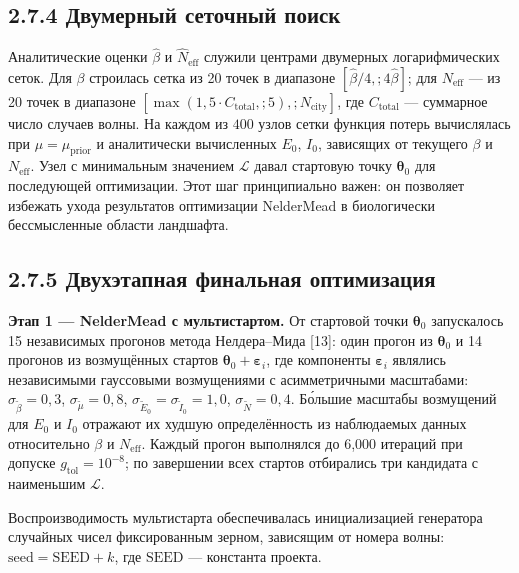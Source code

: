 \documentclass[12pt]{article}
\begin{document}
\subsection{2.7.4 Двумерный сеточный
поиск}\label{ux434ux432ux443ux43cux435ux440ux43dux44bux439-ux441ux435ux442ux43eux447ux43dux44bux439-ux43fux43eux438ux441ux43a}

Аналитические оценки \(\hat{\beta}\) и \(\hat{N}_{\text{eff}}\) служили
центрами двумерных логарифмических сеток. Для \(\beta\) строилась сетка
из 20 точек в диапазоне \([\hat{\beta}/4,; 4\hat{\beta}]\); для
\(N_{\text{eff}}\) --- из 20 точек в диапазоне
\([\max(1{,}5 \cdot C_{\text{total}},; 5),; N_{\text{city}}]\), где
\(C_{\text{total}}\) --- суммарное число случаев волны. На каждом из
\(400\) узлов сетки функция потерь вычислялась при
\(\mu = \mu_{\text{prior}}\) и аналитически вычисленных \(E_0\),
\(I_0\), зависящих от текущего \(\beta\) и \(N_{\text{eff}}\). Узел с
минимальным значением \(\mathcal{L}\) давал стартовую точку
\(\boldsymbol{\theta}_0\) для последующей оптимизации. Этот шаг
принципиально важен: он позволяет избежать ухода результатов оптимизации
NelderMead в биологически бессмысленные области ландшафта.

\subsection{2.7.5 Двухэтапная финальная
оптимизация}\label{ux434ux432ux443ux445ux44dux442ux430ux43fux43dux430ux44f-ux444ux438ux43dux430ux43bux44cux43dux430ux44f-ux43eux43fux442ux438ux43cux438ux437ux430ux446ux438ux44f}

\textbf{Этап 1 --- NelderMead с мультистартом.} От стартовой точки
\(\boldsymbol{\theta}_0\) запускалось 15 независимых прогонов метода
Нелдера--Мида {[}13{]}: один прогон из \(\boldsymbol{\theta}_0\) и 14
прогонов из возмущённых стартов
\(\boldsymbol{\theta}_0 + \boldsymbol{\varepsilon}_i\), где компоненты
\(\boldsymbol{\varepsilon}_i\) являлись независимыми гауссовыми
возмущениями с асимметричными масштабами:
\(\sigma_{\tilde{\beta}} = 0{,}3\), \(\sigma_{\tilde{\mu}} = 0{,}8\),
\(\sigma_{\tilde{E}_0} = \sigma_{\tilde{I}_0} = 1{,}0\),
\(\sigma_{\tilde{N}} = 0{,}4\). Бо́льшие масштабы возмущений для \(E_0\)
и \(I_0\) отражают их худшую определённость из наблюдаемых данных
относительно \(\beta\) и \(N_{\text{eff}}\). Каждый прогон выполнялся до
6,000 итераций при допуске \(g_{\text{tol}} = 10^{-8}\); по завершении
всех стартов отбирались три кандидата с наименьшим \(\mathcal{L}\).

Воспроизводимость мультистарта обеспечивалась инициализацией генератора
случайных чисел фиксированным зерном, зависящим от номера волны:
\(\text{seed} = \text{SEED} + k\), где \(\text{SEED}\) --- константа
проекта.
\end{document}
